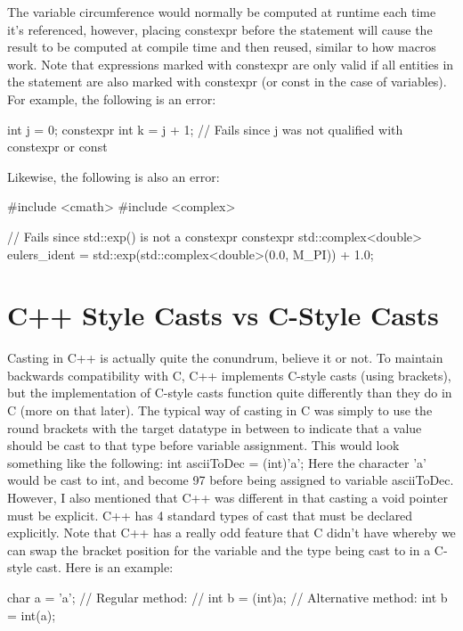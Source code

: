 \documentclass{article}
\begin{document}
The variable circumference would normally be computed at runtime each time it's referenced, however, placing
constexpr before the statement will cause the result to be computed at compile time and then reused, similar
to how macros work. Note that expressions marked with constexpr are only valid if all entities in the
statement are also marked with constexpr (or const in the case of variables). For example, the following is
an error:

\begin{cpplst}

int j = 0;
constexpr int k = j + 1; // Fails since j was not qualified with constexpr or const

\end{cpplst}

Likewise, the following is also an error:

\begin{cpplst}

#include <cmath>
#include <complex>

// Fails since std::exp() is not a constexpr
constexpr std::complex<double> eulers_ident = std::exp(std::complex<double>(0.0, M_PI)) + 1.0;

\end{cpplst}

\section{C++ Style Casts vs C-Style Casts}

Casting in C++ is actually quite the conundrum, believe it or not. To maintain backwards compatibility with
C,  C++ implements C-style casts (using brackets), but the implementation of C-style casts function quite
differently than they do in C (more on that later). The typical way of casting in C was simply to use the
round brackets with the target datatype in between to indicate that a value should be cast to that type
before variable assignment. This would look something like the following: int asciiToDec = (int)'a';  Here
the character 'a' would be cast to int, and become 97 before being assigned to variable asciiToDec. However,
I also mentioned that C++ was different in that casting a void pointer must be explicit. C++ has 4 standard
types of cast that must be declared explicitly. Note that C++ has a really odd feature that C didn’t have
whereby we can swap the bracket position for the variable and the type being cast to in a C-style cast. Here
is an example:

\begin{cpplst}

char a = 'a';
// Regular method:
// int b = (int)a;
// Alternative method:
int b = int(a);

\end{cpplst}
\end{document}
